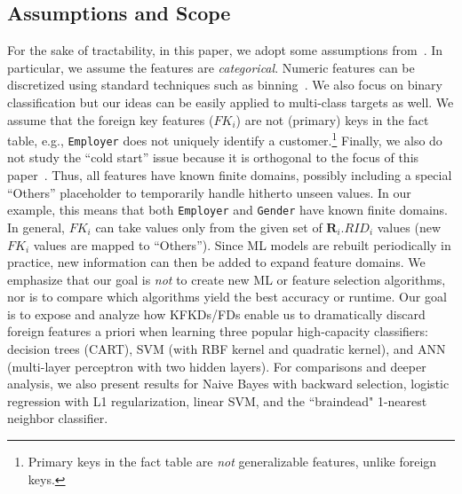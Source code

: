\documentclass{vldb}
\begin{document}
\subsection{Assumptions and Scope}
For the sake of tractability, in this paper, we adopt some assumptions from~\cite{hamlet}. In particular, we assume the features are 
\textit{categorical}. Numeric features can be discretized using standard techniques such as binning~\cite{mitchellbook}. 
We also focus on binary classification but our ideas can be easily applied to multi-class targets as well. 
We assume that the foreign key features ($FK_i$) are not (primary) keys in the fact table, e.g., \texttt{Employer} does 
not uniquely identify a customer.\footnote{Primary keys in the fact table are \textit{not} generalizable features, unlike foreign keys.}
Finally, we also do not study the ``cold start'' issue because it is orthogonal to the focus of this paper~\cite{coldstart}. Thus, all features 
have known finite domains, possibly including a special ``Others'' placeholder to temporarily handle hitherto unseen values. 
In our example, this means that both \texttt{Employer} and \texttt{Gender} have known finite domains.
In general, $FK_i$ can take values only from the given set of $\textbf{R}_i.RID_i$ values (new $FK_i$ values 
are mapped to ``Others''). Since ML models are rebuilt periodically in practice, new information can then be added to expand feature domains. 
We emphasize that our goal is \textit{not} to create new ML or feature selection algorithms, nor is to compare which algorithms yield 
the best accuracy or runtime. Our goal is to expose and analyze how KFKDs/FDs enable us to dramatically discard foreign features a priori 
when learning three popular high-capacity classifiers: decision trees (CART), SVM (with RBF kernel and quadratic kernel), and ANN (multi-layer 
perceptron with two hidden layers). For comparisons and deeper analysis, we also present results for Naive Bayes with backward selection, 
logistic regression with L1 regularization, linear SVM, and the ``braindead" 1-nearest neighbor classifier.
\end{document}
